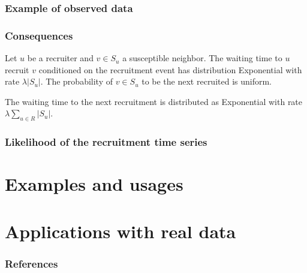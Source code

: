 \documentclass{beamer}
\begin{document}
\begin{frame}

  \frametitle{Example of observed data}

\end{frame}

\begin{frame}
  
  \frametitle{Consequences}

  \begin{theorem}
    Let $u$ be a recruiter and $v \in S_u$ a susceptible neighbor. The waiting
    time to $u$ recruit $v$ conditioned on the recruitment event has
    distribution Exponential with rate $\lambda |S_u|$. The probability of $v
    \in S_u$ to be the next recruited is uniform.  
  \end{theorem}

  \begin{theorem}
    The waiting time to the next recruitment is distributed as Exponential
    with rate $\lambda \sum_{u \in R} |S_u|$.  
  \end{theorem}

\end{frame}

\begin{frame}
  
  \frametitle{Likelihood of the recruitment time series}

\end{frame}
  
\section{Examples and usages}

\section{Applications with real data}

\begin{frame}[t, allowframebreaks]
   \frametitle{References}
   
   
 \end{frame}
\end{document}
